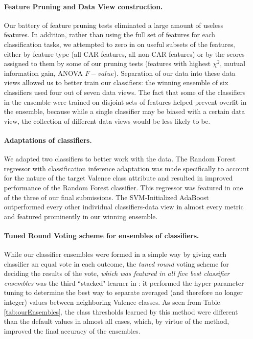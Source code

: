 \paragraph{Feature Pruning and Data View construction.} Our 
battery of feature pruning tests eliminated a large amount of useless features.
In addition, rather than using the full set of features for each classification
tasks, we attempted to zero in on useful subsets of the features, either by
feature type (all CAR features, all non-CAR features) or by the scores
assigned to them by some of our pruning tests (features with highest
$\chi^2$, mutual information gain, ANOVA $F-value$). Separation of our
data into these data views allowed us to better train our classifiers:
the winning ensemble of six classifiers used four out of seven data views.
The fact that some of the classifiers in the ensemble were trained
on disjoint sets of features helped prevent overfit in the ensemble, because while
a single classifier may be biased with a certain data view, the collection
of different data views would be less likely to be. 

\paragraph{Adaptations of classifiers.} We adapted two classifiers
to better work with the data. The \textsf{Random Forest regressor with classification
inference} adaptation was made specifically to account for the nature
of the target \textsf{Valence} class attribute and resulted in improved
performance of the Random Forest classifier. This regressor was featured
in one of the three of our final submissions.  The 
\textsf{SVM-Initialized AdaBoost} outperformed every other individual
classifiers-data view in almost every metric and featured prominently in our winning ensemble.

\paragraph{Tuned Round Voting scheme for ensembles of classifiers.} While
our classifier ensembles were formed in a simple way by giving each classifier
an equal vote in each outcome, the \textit{tuned round} voting scheme for
deciding the results of the vote, \textit{which was featured in all five
best classifier ensembles} was the third ``stacked" learner in \CREATE:
it performed the hyper-parameter tuning to determine the best
way to separate averaged (and therefore no longer integer) values
between neighboring \textsf{Valence} classes. As seen
from Table \ref{tab:ourEnsembles}, the class thresholds learned 
by this method were different than the default values in almost all
cases, which, by virtue of the method, improved the final accuracy of
the ensembles.


